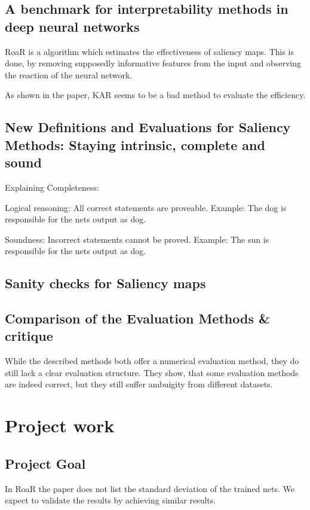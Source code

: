 \section{A benchmark for interpretability methods in deep neural networks}

RoaR is a algorithm which estimates the effectiveness of saliency maps. This is done, by removing supposedly informative features from the input and observing the reaction of the neural network.

As shown in the paper, KAR seems to be a bad method to evaluate the efficiency.


\section{New Definitions and Evaluations for Saliency Methods: Staying intrinsic, complete and sound \cite{gupta2022new}}



Explaining Completeness:

Logical reasoning: All correct statements are proveable. Example: The dog is responsible for the nets output as 
dog. 

Soundness: Incorrect statements cannot be proved. Example: The sun is responsible for the nets output as dog.




\section{Sanity checks for Saliency maps}



\section{Comparison of the Evaluation Methods \& critique}

While the described methods both offer a numerical evaluation method, they do still lack a clear evaluation structure. They show, that some evaluation methods are indeed correct, but they still suffer ambuigity from different datasets.




\chapter{Project work} %


\section{Project Goal}
In RoaR\cite{hooker2019benchmark} the paper does not list the standard deviation of the trained nets. We expect to validate the results by achieving similar results.

